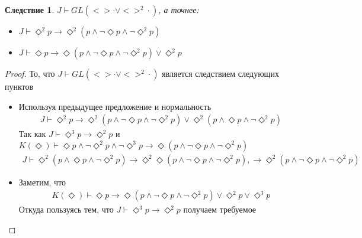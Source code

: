 \documentclass[12pt,a4paper,oneside]{article}
\newtheorem*{corollary}{Следствие}
\begin{document}
  \begin{corollary}
    $J \vdash GL(<>\cdot \vee <>^2\cdot)$, а точнее:
    \begin{itemize}
      \item $J \vdash \Diamond ^2 p \rightarrow \Diamond ^2(p \wedge \neg \Diamond p \wedge \neg
            \Diamond ^2 p)$
      \item $J \vdash \Diamond p \rightarrow \Diamond (p \wedge \neg \Diamond p \wedge \neg \Diamond
            ^2 p) \vee \Diamond ^2 p$
    \end{itemize}
  \end{corollary}
  \begin{proof}
    То, что $J \vdash GL(<>\cdot \vee <>^2\cdot)$ является следствием
    следующих пунктов
    \begin{itemize}
      \item Используя предыдущее предложение и
            нормальность
            \begin{align*}
              J \vdash \Diamond ^2 p \rightarrow \Diamond ^2(p \wedge \neg \Diamond p \wedge \neg
              \Diamond ^2 p) \vee \Diamond ^2(p \wedge \Diamond p \wedge \neg \Diamond ^2 p)
            \end{align*}
            Так как $J \vdash \Diamond ^3 p \rightarrow \Diamond ^2 p$ и $K(\Diamond ) \vdash
            \Diamond p \wedge \neg \Diamond ^2 p \wedge \neg \Diamond ^3 p \rightarrow \Diamond (p
            \wedge \neg \Diamond p \wedge \neg \Diamond ^2 p)$
            \begin{align*}
              J \vdash \Diamond ^2(p \wedge \Diamond p \wedge \neg \Diamond ^2 p) \rightarrow
              \Diamond ^2\Diamond (p \wedge \neg \Diamond p \wedge \neg \Diamond ^2 p), \rightarrow
              \Diamond ^2(p \wedge \neg \Diamond p \wedge \neg \Diamond ^2 p)
            \end{align*}
      \item Заметим, что
            \begin{align*}
              K(\Diamond ) \vdash \Diamond p \rightarrow \Diamond (p \wedge \neg \Diamond p \wedge
              \neg \Diamond ^2 p) \vee \Diamond ^2 p \vee \Diamond ^3 p
            \end{align*}
            Откуда пользуясь тем, что $J \vdash \Diamond ^3 p \rightarrow
            \Diamond ^2 p$ получаем требуемое
    \end{itemize}
  \end{proof}
\end{document}
